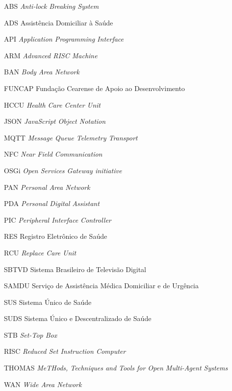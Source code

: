 \begin{siglas}
  \item[ABS] \textit{Anti-lock Breaking System}
  \item[ADS] Assistência Domiciliar à Saúde 
  \item[API] \textit{Application Programming Interface}
  \item[ARM] \textit{Advanced RISC Machine}
  \item[BAN] \textit{Body Area Network}
  \item[FUNCAP] Fundação Cearense de Apoio ao Desenvolvimento
  \item[HCCU] \textit{Health Care Center Unit}
  \item[JSON] \textit{JavaScript Object Notation}
  \item[MQTT] \textit{Message Queue Telemetry Transport}
  \item[NFC] \textit{Near Field Communication}
  \item[OSGi] \textit{Open Services Gateway initiative}
  \item[PAN] \textit{Personal Area Network}
  \item[PDA] \textit{Personal Digital Assistant}
  \item[PIC] \textit{Peripheral Interface Controller}
  \item[RES] Registro Eletrônico de Saúde
  \item[RCU] \textit{Replace Care Unit}
  \item[SBTVD] Sistema Brasileiro de Televisão Digital
  \item[SAMDU] Serviço de Assistência Médica Domiciliar e de Urgência 
  \item[SUS] Sistema Único de Saúde 
  \item[SUDS] Sistema Único e Descentralizado de Saúde 
  \item[STB] \textit{Set-Top Box}
  \item[RISC] \textit{Reduced Set Instruction Computer}
  \item[THOMAS] \textit{MeTHods, Techniques and Tools for Open Multi-Agent Systems}
  \item[WAN] \textit{Wide Area Network}
\end{siglas}

